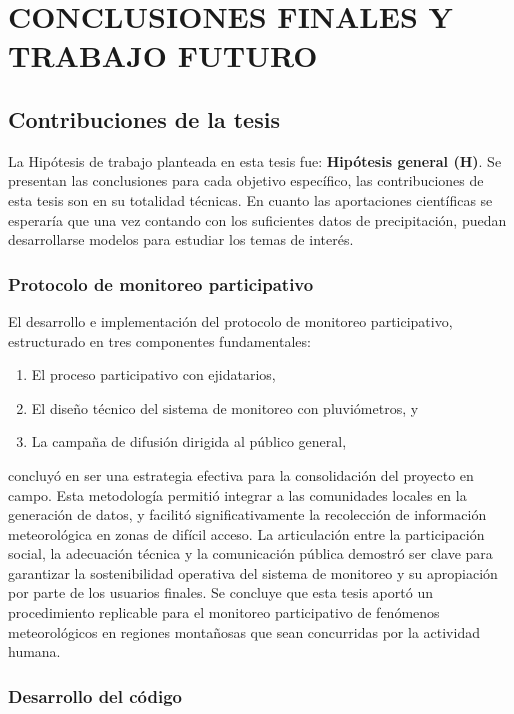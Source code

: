 \chapter{CONCLUSIONES FINALES Y TRABAJO FUTURO}
\section{Contribuciones de la tesis}
La Hipótesis de trabajo planteada en esta tesis fue: \textbf{Hipótesis general (H)}. Se presentan las conclusiones para cada objetivo específico, las contribuciones de esta tesis son en su totalidad técnicas. En cuanto las aportaciones científicas se esperaría que una vez contando con los suficientes datos de precipitación, puedan desarrollarse modelos para estudiar los temas de interés. 
\subsection{Protocolo de monitoreo participativo}
El desarrollo e implementación del protocolo de monitoreo participativo, estructurado en tres componentes fundamentales:

\begin{enumerate}
  \item El proceso participativo con ejidatarios,
  \item El diseño técnico del sistema de monitoreo con pluviómetros, y
  \item La campaña de difusión dirigida al público general,
\end{enumerate}

concluyó en ser una estrategia efectiva para la consolidación del proyecto en campo. Esta metodología permitió integrar a las comunidades locales en la generación de datos, y facilitó significativamente la recolección de información meteorológica en zonas de difícil acceso. La articulación entre la participación social, la adecuación técnica y la comunicación pública demostró ser clave para garantizar la sostenibilidad operativa del sistema de monitoreo y su apropiación por parte de los usuarios finales. Se concluye que esta tesis aportó un procedimiento replicable para el monitoreo participativo de fenómenos meteorológicos en regiones montañosas que sean concurridas por la actividad humana.


\subsection{Desarrollo del código}

